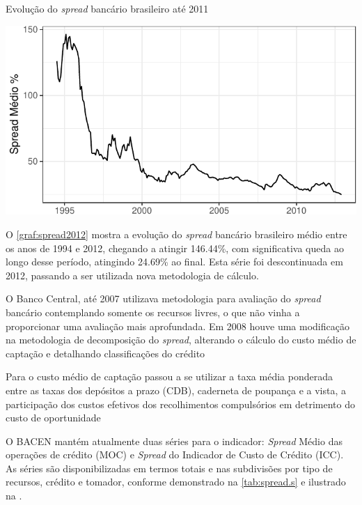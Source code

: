 \documentclass[
  12pt,
  12pt,
  openright,
  oneside,
  a4paper,
  chapter=TITLE,
  section=TITLE,
  subsection=TITLE,
  subsubsection=TITLE,
  english,
  portugues,
  sumario=tradicional]{abntex2}
\begin{document}
\begin{grafico}[!hbtp]
\vspace{20pt}
\caption{Evolução do \emph{spread} bancário brasileiro até 2011}
\vspace{-4mm}

\begin{center}\includegraphics{12-exportedfigures/average spread-1} \end{center}
\vspace{-3mm}
\label{graf:spread2012}
\vspace{-2mm}
\end{grafico}

O \autoref{graf:spread2012} mostra a evolução do \emph{spread} bancário brasileiro médio entre os anos de 1994 e 2012, chegando a atingir 146.44\%, com significativa queda ao longo desse período, atingindo 24.69\% ao final. Esta série foi descontinuada em 2012, passando a ser utilizada nova metodologia de cálculo.

O Banco Central, até 2007 utilizava metodologia para avaliação do \emph{spread} bancário contemplando somente os recursos livres, o que não vinha a proporcionar uma avaliação mais aprofundada. Em 2008 houve uma modificação na metodologia de decomposição do \emph{spread}, alterando o cálculo do custo médio de captação e detalhando classificações do crédito \cite{dantas:2012}

Para o custo médio de captação passou a se utilizar a taxa média ponderada entre as taxas dos depósitos a prazo (CDB), caderneta de poupança e a vista, a participação dos custos efetivos dos recolhimentos compulsórios em detrimento do custo de oportunidade \cite{dantas:2012}

O BACEN mantém atualmente duas séries para o indicador: \emph{Spread} Médio das operações de crédito (MOC) e \emph{Spread} do Indicador de Custo de Crédito (ICC). As séries são disponibilizadas em termos totais e nas subdivisões por tipo de
recursos, crédito e tomador, conforme demonstrado na \autoref{tab:spread.s} e ilustrado na .
\end{document}
